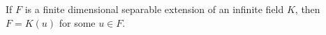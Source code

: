 If $F$ is a finite dimensional separable extension of an infinite field $K$, then $F = K(u)$ for some $u \in F$.

